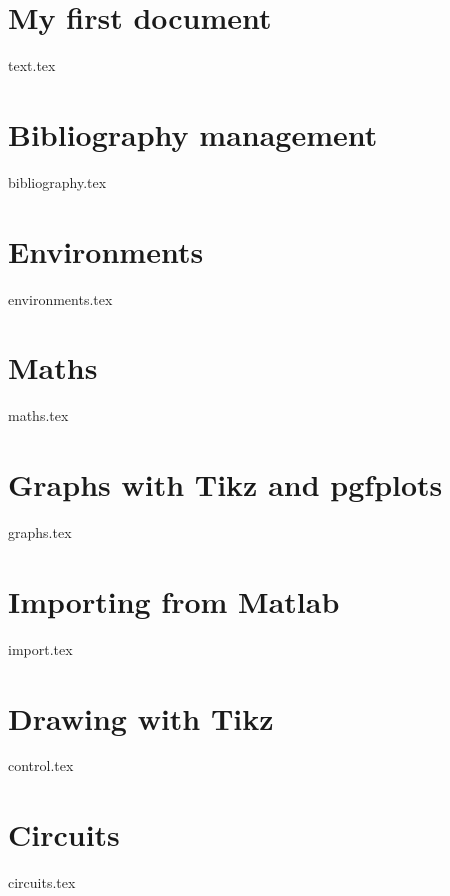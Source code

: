 \section{My first document}
    {text.tex}
\section{Bibliography management}
    {bibliography.tex}
\section{Environments}
    {environments.tex}
\section{Maths}
    {maths.tex}
\section{Graphs with Tikz and pgfplots}
    {graphs.tex}
\section{Importing from Matlab}
    {import.tex}
\section{Drawing with Tikz}
    {control.tex}
\section{Circuits}
        {circuits.tex}